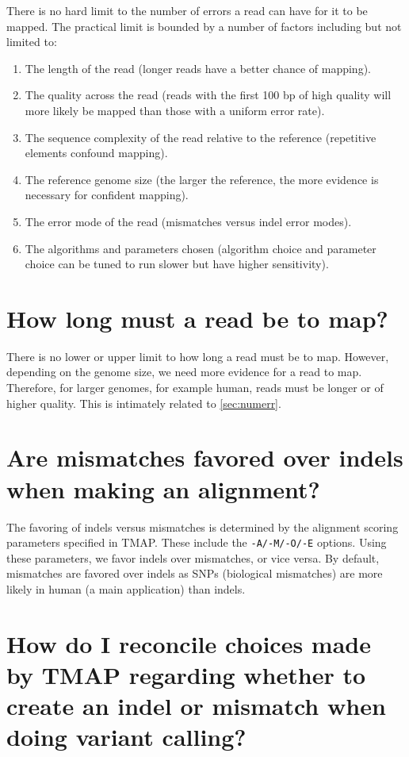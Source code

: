 \documentclass[a4paper,12pt]{book}
\newcommand{\TT}[1]{{\tt #1}} %
\begin{document}
There is no hard limit to the number of errors a read can have for it to be mapped.
The practical limit is bounded by a number of factors including but not limited to:
\begin{enumerate}
	\item The length of the read (longer reads have a better chance of mapping).
	\item The quality across the read (reads with the first 100 bp of high quality will more likely be mapped than those with a uniform error rate).
	\item The sequence complexity of the read relative to the reference (repetitive elements confound mapping).
	\item The reference genome size (the larger the reference, the more evidence is necessary for confident mapping).
	\item The error mode of the read (mismatches versus indel error modes).
	\item The algorithms and parameters chosen (algorithm choice and parameter choice can be tuned to run slower but have higher sensitivity).
\end{enumerate}
		
\section{How long must a read be to map?}

There is no lower or upper limit to how long a read must be to map.
However, depending on the genome size, we need more evidence for a read to map.  
Therefore, for larger genomes, for example human, reads must be longer or of higher quality.
This is intimately related to \autoref{sec:numerr}.

\section{Are mismatches favored over indels when making an alignment?}

The favoring of indels versus mismatches is determined by the alignment
scoring parameters specified in TMAP.  
These include the \TT{-A/-M/-O/-E} options.  
Using these parameters, we favor indels over mismatches, or vice versa.  
By default, mismatches are favored over indels as SNPs (biological mismatches) are more likely in human (a main application) than indels.

\section{How do I reconcile choices made by TMAP regarding whether to create an indel or mismatch when doing variant calling?}
\end{document}
